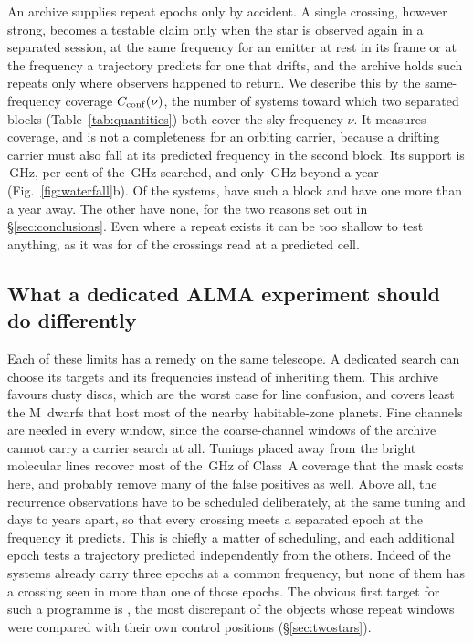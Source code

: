 An archive supplies repeat epochs only by accident. A single crossing,
however strong, becomes a testable claim only when the star is observed
again in a separated session, at the same frequency for an emitter at rest in
its frame or at the frequency a trajectory predicts for one that drifts, and
the archive holds such repeats only where observers happened to return.
We describe this by the same-frequency coverage
$C_{\rm conf}(\nu)$, the number of systems toward which two separated blocks
(Table~\ref{tab:quantities}) both cover the sky frequency $\nu$. It measures
coverage, and is not a completeness for an orbiting carrier, because a
drifting carrier must also fall at its predicted frequency in the second
block. Its support is \CvConfGHzDay\,GHz, \CvConfPctDay{} per cent of the
\CvUnionA\,GHz searched, and only \CvConfGHzYr\,GHz beyond a year
(Fig.~\ref{fig:waterfall}b). Of the \NSysClassA{} systems, \ZcConfSysDay{}
have such a block and \ZcConfSysYr{} have one more than a year away. The
other \ZcNoRepSys{} have none, for the two reasons set out in
\S\ref{sec:conclusions}. Even where a repeat exists it can be
too shallow to test anything, as it was for \HjNPowerLo{} of the \RcNExcl{}
crossings read at a predicted cell.

\subsection{What a dedicated ALMA experiment should do differently}
\label{sec:future}

Each of these limits has a remedy on the same telescope. A dedicated search
can choose its targets and its frequencies instead of inheriting them. This
archive favours dusty discs, which are the worst case for line confusion, and
covers least the M~dwarfs that host most of the nearby habitable-zone
planets. Fine channels are needed in every window, since the \NCoarse{}
coarse-channel windows of the archive cannot carry a carrier search at all.
Tunings placed away from the bright molecular lines recover most of the
\MkMaskAGHz\,GHz of Class~A coverage that the mask costs here, and probably
remove many of the false positives as well. Above all, the recurrence
observations have to be scheduled deliberately, at the same tuning and days
to years apart, so that every crossing meets a separated epoch at the
frequency it predicts. This is chiefly a matter of scheduling, and each
additional epoch tests a trajectory predicted independently from the others.
Indeed \PaNSysThree{} of the \NSysClassA{} systems already carry three epochs
at a common frequency, but none of them has a crossing seen in more than one
of those epochs. The obvious first target for such a programme is \BkAlmaName, the most
discrepant of the objects whose repeat windows were compared with their own
control positions (\S\ref{sec:twostars}).
